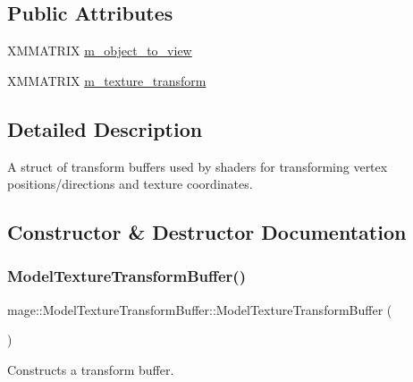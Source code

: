 \subsection*{Public Attributes}
\begin{DoxyCompactItemize}
\item 
X\+M\+M\+A\+T\+R\+IX \hyperlink{structmage_1_1_model_texture_transform_buffer_adb5e9e5b5d8c48267f0947c1ebc67b27}{m\+\_\+object\+\_\+to\+\_\+view}
\item 
X\+M\+M\+A\+T\+R\+IX \hyperlink{structmage_1_1_model_texture_transform_buffer_aec121458581c6508c8caaab65b073b73}{m\+\_\+texture\+\_\+transform}
\end{DoxyCompactItemize}


\subsection{Detailed Description}
A struct of transform buffers used by shaders for transforming vertex positions/directions and texture coordinates. 

\subsection{Constructor \& Destructor Documentation}
\hypertarget{structmage_1_1_model_texture_transform_buffer_a8db3a9beb1605af8eaf86e76ae909b6b}{}\label{structmage_1_1_model_texture_transform_buffer_a8db3a9beb1605af8eaf86e76ae909b6b} 
\subsubsection{\texorpdfstring{Model\+Texture\+Transform\+Buffer()}{ModelTextureTransformBuffer()}\hspace{0.1cm}{\footnotesize\ttfamily [1/3]}}
{\footnotesize\ttfamily mage\+::\+Model\+Texture\+Transform\+Buffer\+::\+Model\+Texture\+Transform\+Buffer (\begin{DoxyParamCaption}{ }\end{DoxyParamCaption})\hspace{0.3cm}{\ttfamily [noexcept]}}

Constructs a transform buffer. \hypertarget{structmage_1_1_model_texture_transform_buffer_a8343debdebb3d3c3df8c82ee5c3d88ab}{}\label{structmage_1_1_model_texture_transform_buffer_a8343debdebb3d3c3df8c82ee5c3d88ab} 
